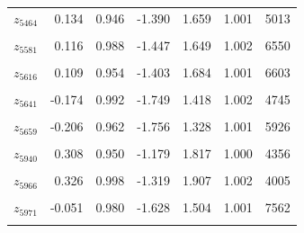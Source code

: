 \begin{longtable}{lrrrrrr}
$z_{5464}$ & 0.134 & 0.946 & -1.390 & 1.659 & 1.001 & 5013\\
\cellcolor{gray!10}{$z_{5515}$} & \cellcolor{gray!10}{0.092} & \cellcolor{gray!10}{0.989} & \cellcolor{gray!10}{-1.483} & \cellcolor{gray!10}{1.659} & \cellcolor{gray!10}{1.002} & \cellcolor{gray!10}{6338}\\
$z_{5581}$ & 0.116 & 0.988 & -1.447 & 1.649 & 1.002 & 6550\\
\cellcolor{gray!10}{$z_{5610}$} & \cellcolor{gray!10}{0.100} & \cellcolor{gray!10}{0.973} & \cellcolor{gray!10}{-1.441} & \cellcolor{gray!10}{1.635} & \cellcolor{gray!10}{1.003} & \cellcolor{gray!10}{6277}\\
$z_{5616}$ & 0.109 & 0.954 & -1.403 & 1.684 & 1.001 & 6603\\
\cellcolor{gray!10}{$z_{5619}$} & \cellcolor{gray!10}{-0.295} & \cellcolor{gray!10}{0.958} & \cellcolor{gray!10}{-1.787} & \cellcolor{gray!10}{1.219} & \cellcolor{gray!10}{1.003} & \cellcolor{gray!10}{4593}\\
$z_{5641}$ & -0.174 & 0.992 & -1.749 & 1.418 & 1.002 & 4745\\
\cellcolor{gray!10}{$z_{5644}$} & \cellcolor{gray!10}{-0.003} & \cellcolor{gray!10}{0.980} & \cellcolor{gray!10}{-1.558} & \cellcolor{gray!10}{1.578} & \cellcolor{gray!10}{1.003} & \cellcolor{gray!10}{5854}\\
$z_{5659}$ & -0.206 & 0.962 & -1.756 & 1.328 & 1.001 & 5926\\
\cellcolor{gray!10}{$z_{5664}$} & \cellcolor{gray!10}{-0.217} & \cellcolor{gray!10}{0.970} & \cellcolor{gray!10}{-1.749} & \cellcolor{gray!10}{1.323} & \cellcolor{gray!10}{1.002} & \cellcolor{gray!10}{4467}\\
$z_{5940}$ & 0.308 & 0.950 & -1.179 & 1.817 & 1.000 & 4356\\
\cellcolor{gray!10}{$z_{5963}$} & \cellcolor{gray!10}{0.402} & \cellcolor{gray!10}{0.974} & \cellcolor{gray!10}{-1.190} & \cellcolor{gray!10}{1.916} & \cellcolor{gray!10}{1.001} & \cellcolor{gray!10}{3106}\\
$z_{5966}$ & 0.326 & 0.998 & -1.319 & 1.907 & 1.002 & 4005\\
\cellcolor{gray!10}{$z_{5970}$} & \cellcolor{gray!10}{-0.039} & \cellcolor{gray!10}{1.008} & \cellcolor{gray!10}{-1.634} & \cellcolor{gray!10}{1.552} & \cellcolor{gray!10}{1.002} & \cellcolor{gray!10}{6411}\\
$z_{5971}$ & -0.051 & 0.980 & -1.628 & 1.504 & 1.001 & 7562\\
\cellcolor{gray!10}{$z_{5992}$} & \cellcolor{gray!10}{-0.062} & \cellcolor{gray!10}{0.979} & \cellcolor{gray!10}{-1.657} & \cellcolor{gray!10}{1.495} & \cellcolor{gray!10}{1.002} & \cellcolor{gray!10}{6313}\\

\end{longtable}
